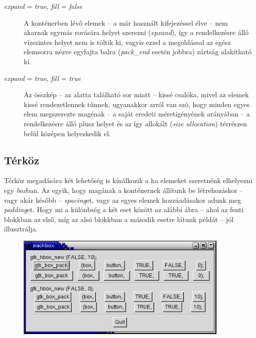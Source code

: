 \documentclass[a4paper,10pt]{article}
\begin{document}
\begin{description}
 \item[\textit{expand} = \textit{true}, \textit{fill} = \textit{false}] A konténerben lévő elemek -- a már használt kifejezéssel élve -- nem akarnak egymás rovására helyet szerezni (\textit{epxand}), így a rendelkezésre álló vízszintes helyet nem is töltik ki, vagyis ezzel a megoldással az egész elemsorra nézve egyfajta balra (\textit{pack\_end} esetén jobbra) zártság alakítható ki.

 \item[\textit{expand} = \textit{true}, \textit{fill} = \textit{true}] Az összkép -- az alatta található sor miatt -- kissé csalóka, mivel az elemek kissé rendezetlennek tűnnek, ugyanakkor arról van szó, hogy minden egyes elem megszerezte magénak -- a saját eredeti méretigényének arányában -- a rendelkezésre álló plusz helyet és az így allokált (\textit{size allocation}) térrészen belül középen helyezkedik el.
\end{description}

\subsection{Térköz}

Térköz megadására két lehetőség is kínálkozik a ha elemeket szeretnénk elhelyezni egy \textit{box}ban. Az egyik, hogy magának a konténernek állítunk be létrehozáskor -- vagy akár később -- \textit{spacing}et, vagy az egyes elemek hozzáadásakor adunk meg \textit{padding}et. Hogy mi a különbség a két eset között az alábbi ábra -- ahol az fenti blokkban az első, míg az alsó blokkban a második esetre látunk példát -- jól illusztrálja.

\vspace{12 pt}
\begin{figure}[H]
\begin{center}
\includegraphics[height=50mm]{images/packbox2.png}
\end{center}
\end{figure}
\end{document}
